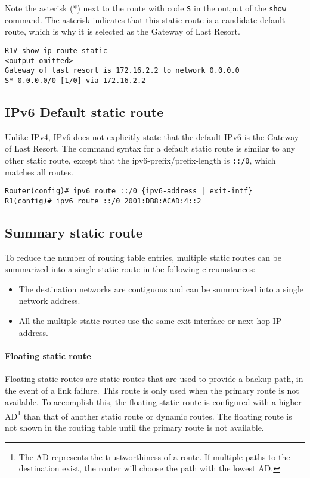 Note the asterisk (*) next to the route with code \verb|S| in the output of the \verb|show| command. The asterisk indicates that this static route is a candidate default route, which is why it is selected as the Gateway of Last Resort.

\begin{verbatim}
R1# show ip route static
<output omitted>
Gateway of last resort is 172.16.2.2 to network 0.0.0.0
S* 0.0.0.0/0 [1/0] via 172.16.2.2
\end{verbatim}

\subsection{IPv6 Default static route}  

Unlike IPv4, IPv6 does not explicitly state that the default IPv6 is the Gateway of Last Resort. The command syntax for a default static route is similar to any other static route, except that the ipv6-prefix/prefix-length is \verb|::/0|, which matches all routes.

\begin{verbatim}
Router(config)# ipv6 route ::/0 {ipv6-address | exit-intf}
R1(config)# ipv6 route ::/0 2001:DB8:ACAD:4::2
\end{verbatim}

\subsection{Summary static route}

To reduce the number of routing table entries, multiple static routes can be summarized into a single static route in the following circumstances:

\begin{itemize}
\item The destination networks are contiguous and can be summarized into a single network address.
\item All the multiple static routes use the same exit interface or next-hop IP address.
\end{itemize}

\paragraph{Floating static route}

Floating static routes are static routes that are used to provide a backup path, in the event of a link failure. This route is only used when the primary route is not available. To accomplish this, the floating static route is configured with a higher AD\footnote{The AD represents the trustworthiness of a route. If multiple paths to the destination exist, the router will choose the path with the lowest AD.} than that of another static route or dynamic routes. The floating route is not shown in the routing table until the primary route is not available.

